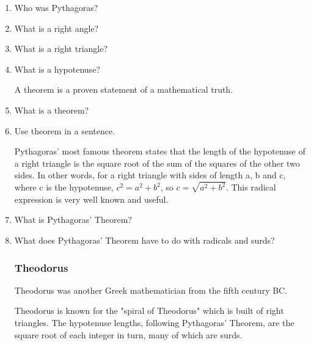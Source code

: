 \documentclass{article}
\begin{document}
\begin{enumerate}
\item Who was Pythagoras?
\item What is a right angle?
\item What is a right triangle?
\item What is a hypotenuse?

A theorem is a proven statement of a mathematical truth. 

\item What is a theorem?
\item Use theorem in a sentence.


Pythagoras' most famous theorem states that the length of the hypotenuse of a right triangle is the square root of the sum of the squares of the other two sides. In other words, for a right triangle with sides of length a, b and c, where c is the hypotenuse, $c^2=a^2+b^2$, so $c=\sqrt{a^2+b^2}$. This radical expression is very well known and useful.

\item What is Pythagoras' Theorem?
\item What does Pythagoras' Theorem have to do with radicals and surds?

\subsubsection*{Theodorus}

Theodorus was another Greek mathematician from the fifth century BC.

Theodorus is known for the "spiral of Theodorus" which is built of right triangles. The hypotenuse lengths, following Pythagoras' Theorem, are the square root of each integer in turn, many of which are surds.


\end{enumerate}
\end{document}

